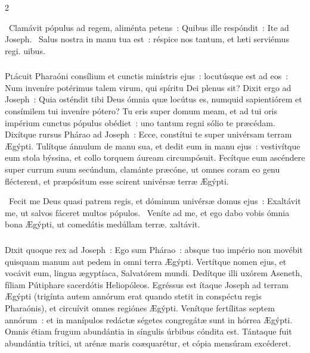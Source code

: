 \documentclass[9pt,twoside]{extarticle}
\begin{document}
\begin{multicols}{2}
{\begin{tightlist}{}
\item {}~Clamávit pópulus ad regem, aliménta petens~: \textred{*} Quibus ille respóndit~: Ite ad Joseph. ~Salus nostra in manu tua est~: réspice nos tantum, et læti serviémus regi. uibus.
\end{tightlist}

\subsubsection*{\center {}}
\lettrine{P}lácuit Pharaóni consílium et cunctis minístris ejus~:
locutúsque est ad eos~: Num inveníre potérimus talem virum, qui spíritu Dei plenus sit?
Dixit ergo ad Joseph~: Quia osténdit tibi Deus ómnia quæ locútus es, numquid sapientiórem et consímilem tui inveníre pótero?
Tu eris super domum meam, et ad tui oris impérium cunctus pópulus obédiet~: uno tantum regni sólio te præcédam.
Dixítque rursus Phárao ad Joseph~: Ecce, constítui te super univérsam terram Ægýpti.
Tulítque ánnulum de manu sua, et dedit eum in manu ejus~: vestivítque eum stola býssina, et collo torquem áuream circumpósuit.
Fecítque eum ascéndere super currum suum secúndum, clamánte præcóne, ut omnes coram eo genu flécterent, et præpósitum esse scirent univérsæ terræ Ægýpti.

\begin{tightlist}{}
\item {}~Fecit me Deus quasi patrem regis, et dóminum univérsæ domus ejus~: \textred{*} Exaltávit me, ut salvos fáceret multos pópulos. ~Veníte ad me, et ego dabo vobis ómnia bona Ægýpti, ut comedátis medúllam terræ. xaltávit.
\end{tightlist}

\subsubsection*{\center {}}
\lettrine{D}ixit quoque rex ad Joseph~: Ego sum Phárao~: absque tuo império non movébit quisquam manum aut pedem in omni terra Ægýpti.
Vertítque nomen ejus, et vocávit eum, lingua ægyptíaca, Salvatórem mundi. Dedítque illi uxórem Aseneth, fíliam Pútiphare sacerdótis Heliopóleos. Egréssus est ítaque Joseph ad terram Ægýpti
(trigínta autem annórum erat quando stetit in conspéctu regis Pharaónis), et circuívit omnes regiónes Ægýpti.
Venítque fertílitas septem annórum~: et in manípulos redáctæ ségetes congregátæ sunt in hórrea Ægýpti.
Omnis étiam frugum abundántia in síngulis úrbibus cóndita est.
Tántaque fuit abundántia trítici, ut arénæ maris coæquarétur, et cópia mensúram excéderet.

}
\end{multicols}
\end{document}
